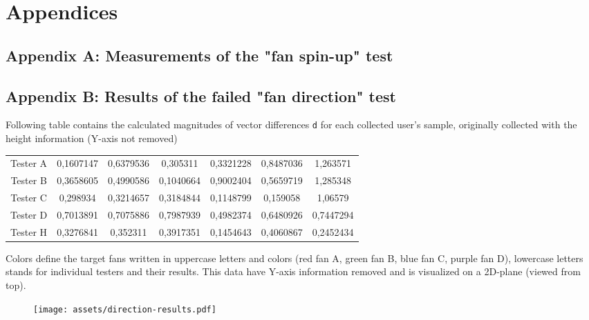 \chapter{Appendices}

\section*{Appendix A: Measurements of the "fan spin-up" test}

\label{appx:b}
\section*{Appendix B: Results of the failed "fan direction" test}
Following table contains the calculated magnitudes of vector differences \texttt{d}
for each collected user’s sample, originally collected with the
height information (Y-axis not removed)


\begin{center}
\begin{tabular}{|c|c|c|c|c|c|c|}
\hline
Tester A & 0,1607147 & 0,6379536 & 0,305311 & 0,3321228 & 0,8487036 & 1,263571 \\ 
Tester B & 0,3658605 & 0,4990586 & 0,1040664 & 0,9002404 & 0,5659719 & 1,285348 \\ 
Tester C & 0,298934 & 0,3214657 & 0,3184844 & 0,1148799 & 0,159058 & 1,06579 \\ 
Tester D & 0,7013891 & 0,7075886 & 0,7987939 & 0,4982374 & 0,6480926 & 0,7447294 \\ 
Tester H & 0,3276841 & 0,352311 & 0,3917351 & 0,1454643 & 0,4060867 & 0,2452434 \\ 
\hline
\end{tabular}
\end{center}

Colors define the target fans written in uppercase letters and colors
(red fan A, green fan B, blue fan C, purple fan D),
lowercase letters stands for individual testers and their results. This data
have Y-axis information removed and is visualized on a 2D-plane
(viewed from top).


\begin{figure}[h]{}
\centering\texttt{[image: assets/direction-results.pdf]}
\caption{}

\end{figure}
